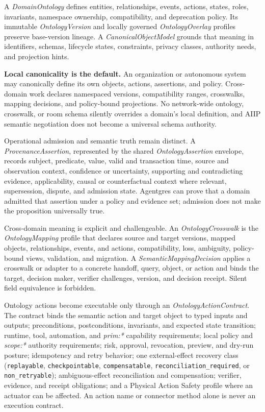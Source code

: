 \documentclass[
  11pt,
]{article}
\begin{document}
A \emph{DomainOntology} defines entities, relationships, events, actions,
states, roles, invariants, namespace ownership, compatibility, and deprecation
policy. Its immutable \emph{OntologyVersion} and locally governed
\emph{OntologyOverlay} profiles preserve base-version lineage. A
\emph{CanonicalObjectModel} grounds that meaning in identifiers, schemas,
lifecycle states, constraints, privacy classes, authority needs, and
projection hints.

\textbf{Local canonicality is the default.} An organization or autonomous
system may canonically define its own objects, actions, assertions, and policy.
Cross-domain work declares namespaced versions, compatibility ranges,
crosswalks, mapping decisions, and policy-bound projections. No network-wide
ontology, crosswalk, or room schema silently overrides a domain's local
definition, and AIIP semantic negotiation does not become a universal schema
authority.

Operational admission and semantic truth remain distinct. A
\emph{ProvenanceAssertion}, represented by the shared
\emph{OntologyAssertion} envelope, records subject, predicate, value, valid and
transaction time, source and observation context, confidence or uncertainty,
supporting and contradicting evidence, applicability, causal or
counterfactual context where relevant, supersession, dispute, and admission
state. Agentgres can prove that a domain admitted that assertion under a
policy and evidence set; admission does not make the proposition universally
true.

Cross-domain meaning is explicit and challengeable. An
\emph{OntologyCrosswalk} is the \emph{OntologyMapping} profile that declares
source and target versions, mapped objects, relationships, events, and actions,
compatibility, loss, ambiguity, policy-bound views, validation, and migration.
A \emph{SemanticMappingDecision} applies a crosswalk or adapter to a concrete
handoff, query, object, or action and binds the target, decision maker,
verifier challenges, version, and decision receipt. Silent field equivalence
is forbidden.

Ontology actions become executable only through an
\emph{OntologyActionContract}. The contract binds the semantic action and
target object to typed inputs and outputs; preconditions, postconditions,
invariants, and expected state transition; runtime, tool, automation, and
\emph{prim:*} capability requirements; local policy and \emph{scope:*}
authority requirements; risk, approval, revocation, preview, and dry-run
posture; idempotency and retry behavior; one external-effect recovery class
(\texttt{replayable}, \texttt{checkpointable}, \texttt{compensatable},
\texttt{reconciliation\_required}, or \texttt{non\_retryable}); ambiguous-effect
reconciliation and compensation; verifier, evidence, and receipt obligations;
and a Physical Action Safety profile where an actuator can be affected. An
action name or connector method alone is never an execution contract.
\end{document}
